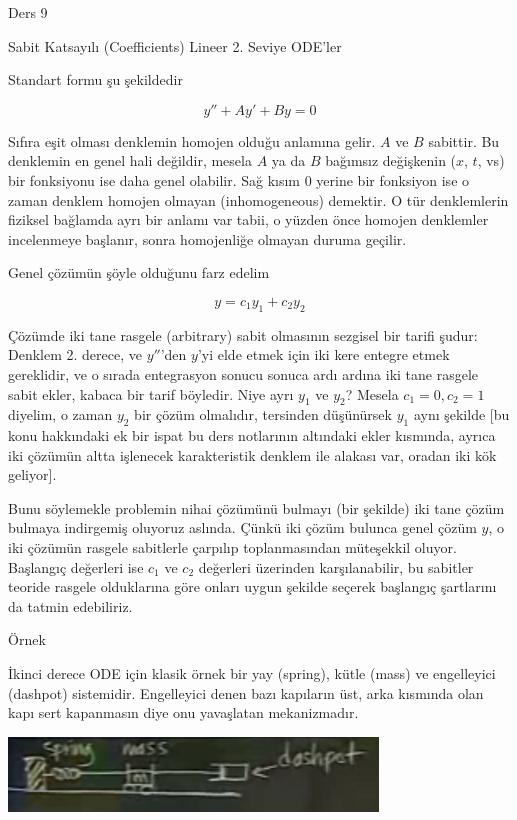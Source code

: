 \documentclass[12pt,fleqn]{article}\usepackage{../../common}
\begin{document}
Ders 9

Sabit Katsayılı (Coefficients) Lineer 2. Seviye ODE'ler 

Standart formu şu şekildedir

$$ y'' + Ay' + By = 0 $$

Sıfıra eşit olması denklemin homojen olduğu anlamına gelir. $A$ ve $B$
sabittir. Bu denklemin en genel hali değildir, mesela $A$ ya da $B$ bağımsız
değişkenin ($x$, $t$, vs) bir fonksiyonu ise daha genel olabilir. Sağ kısım 0
yerine bir fonksiyon ise o zaman denklem homojen olmayan (inhomogeneous)
demektir. O tür denklemlerin fiziksel bağlamda ayrı bir anlamı var tabii, o
yüzden önce homojen denklemler incelenmeye başlanır, sonra homojenliğe olmayan
duruma geçilir.

Genel çözümün şöyle olduğunu farz edelim

$$ y = c_1 y_1 + c_2 y_2 $$

Çözümde iki tane rasgele (arbitrary) sabit olmasının sezgisel bir tarifi
şudur: Denklem 2. derece, ve $y''$'den $y$'yi elde etmek için iki kere
entegre etmek gereklidir, ve o sırada entegrasyon sonucu sonuca ardı ardına
iki tane rasgele sabit ekler, kabaca bir tarif böyledir. Niye ayrı $y_1$ ve
$y_2$?  Mesela $c_1 = 0, c_2 = 1$ diyelim, o zaman $y_2$ bir çözüm
olmalıdır, tersinden düşünürsek $y_1$ aynı şekilde [bu konu hakkındaki ek
bir ispat bu ders notlarının altındaki ekler kısmında, ayrıca iki çözümün
altta işlenecek karakteristik denklem ile alakası var, oradan iki kök
geliyor].

Bunu söylemekle problemin nihai çözümünü bulmayı (bir şekilde) iki tane çözüm
bulmaya indirgemiş oluyoruz aslında. Çünkü iki çözüm bulunca genel çözüm $y$, o
iki çözümün rasgele sabitlerle çarpılıp toplanmasından müteşekkil
oluyor. Başlangıç değerleri ise $c_1$ ve $c_2$ değerleri üzerinden
karşılanabilir, bu sabitler teoride rasgele olduklarına göre onları uygun
şekilde seçerek başlangıç şartlarını da tatmin edebiliriz.

Örnek

İkinci derece ODE için klasik örnek bir yay (spring), kütle (mass) ve
engelleyici (dashpot) sistemidir. Engelleyici denen bazı kapıların üst,
arka kısmında olan kapı sert kapanmasın diye onu yavaşlatan mekanizmadır.

\includegraphics[height=2cm]{9_1.png}
\end{document}
